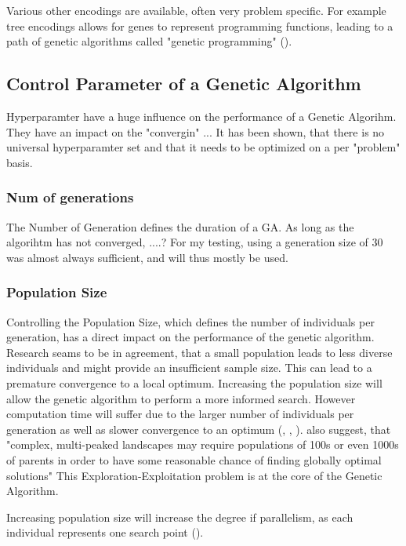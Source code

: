 Various other encodings are available, often very problem specific. For example tree encodings allows for genes to represent programming functions, leading to a path of genetic algorithms called "genetic programming" (\cite{katoch_review_2021}).


\subsection{Control Parameter of a Genetic Algorithm}
Hyperparamter have a huge influence on the performance of a Genetic Algorihm. They have an impact on the "convergin" ...
It has been shown, that there is no universal hyperparamter set and that it needs to be optimized on a per "problem" basis.

\subsubsection{Num of generations}
The Number of Generation defines the duration of a GA. As long as the algorihtm has not converged, ....?
For my testing, using a generation size of 30 was almost always sufficient, and will thus mostly be used.

\subsubsection{Population Size}
Controlling the Population Size, which defines the number of individuals per generation, has a direct impact on the performance of the genetic algorithm.
Research seams to be in agreement, that a small population leads to less diverse individuals and might provide an insufficient sample size. This can lead to a premature convergence to a local optimum.
Increasing the population size will allow the genetic algorithm to perform a more informed search. However computation time will suffer due to the larger number of individuals per generation as well as slower convergence to an optimum (\cite{grefenstette_optimization_1986}, \cite{katoch_review_2021}, \cite{kacprzyk_parameter_2007}).
\cite{kacprzyk_parameter_2007} also suggest, that "complex, multi-peaked landscapes may require populations of 100s or even 1000s of parents in order to have some reasonable chance of finding globally optimal solutions"
This Exploration-Exploitation problem is at the core of the Genetic Algorithm.

Increasing population size will increase the degree if parallelism, as each individual represents one search point (\cite{mills_determining_2015}).


